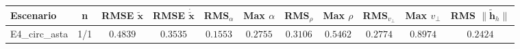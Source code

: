 \begin{tabular}{lcccccccccc}
\toprule
Escenario & n & RMSE $\tilde{\mathbf{x}}$ & RMSE $\dot{\tilde{\mathbf{x}}}$ & RMS$_\alpha$ & Max $\alpha$ & RMS$_\rho$ & Max $\rho$ & RMS$_{v_\perp}$ & Max $v_\perp$ & RMS $\|\tilde{\mathbf{h}}_h\|$ \\
\midrule
E4\_circ\_asta & 1/1 & $0.4839$ & $0.3535$ & $0.1553$ & $0.2755$ & $0.3106$ & $0.5462$ & $0.2774$ & $0.8974$ & $0.2424$ \\
\bottomrule
\end{tabular}
